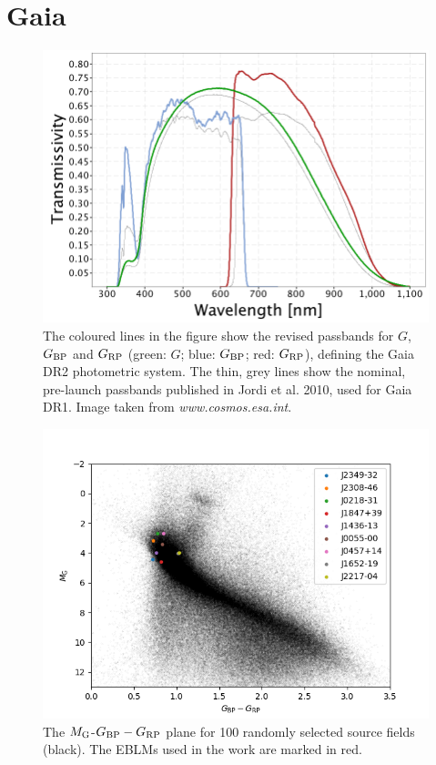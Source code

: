 \section{Gaia}

\begin{figure}
    \centering
    \includegraphics[scale=0.5]{6-images/GaiaDR2Passbands.png}
    \caption{The coloured lines in the figure show the revised passbands for $G$, $G_{\rm BP}$ and $G_{\rm RP}$ (green: $G$; blue: $G_{\rm BP}$; red: $G_{\rm RP}$), defining the Gaia DR2 photometric system. The thin, grey lines show the nominal, pre-launch passbands published in Jordi et al. 2010, used for Gaia DR1. Image taken from \textit{www.cosmos.esa.int}.}
    \label{methods:fig:gaia_EBLMs_passband}
\end{figure}


\begin{figure}
    \centering
    \includegraphics{6-images/Gaia_EBLMs.png}
    \caption{The $M_{\rm G}$-$G_{\rm BP}-G_{\rm RP}$ plane for 100 randomly selected source fields (black). The EBLMs used in the work are marked in red. }
    \label{methods:fig:gaia_EBLMsmy_label}
\end{figure}


